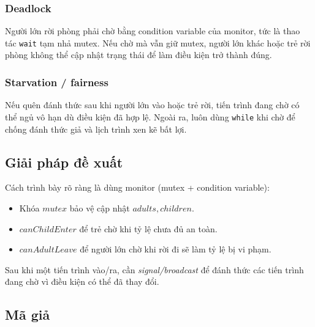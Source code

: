 \subsubsection*{Deadlock}
Người lớn rời phòng phải chờ bằng condition variable của monitor, tức là thao
tác \texttt{wait} tạm nhả mutex. Nếu chờ mà vẫn giữ mutex, người lớn khác hoặc
trẻ rời phòng không thể cập nhật trạng thái để làm điều kiện trở thành đúng.

\subsubsection*{Starvation / fairness}
Nếu quên đánh thức sau khi người lớn vào hoặc trẻ rời, tiến trình đang chờ có
thể ngủ vô hạn dù điều kiện đã hợp lệ. Ngoài ra, luôn dùng \texttt{while} khi
chờ để chống đánh thức giả và lịch trình xen kẽ bất lợi.

\subsection{Giải pháp đề xuất}
Cách trình bày rõ ràng là dùng monitor (mutex + condition variable):
\begin{itemize}
    \item Khóa $mutex$ bảo vệ cập nhật $adults, children$.
    \item $canChildEnter$ để trẻ chờ khi tỷ lệ chưa đủ an toàn.
    \item $canAdultLeave$ để người lớn chờ khi rời đi sẽ làm tỷ lệ bị vi phạm.
\end{itemize}
Sau khi một tiến trình vào/ra, cần \textit{signal/broadcast} để đánh thức các tiến trình đang chờ vì điều kiện có thể đã thay đổi.

\subsection{Mã giả}

